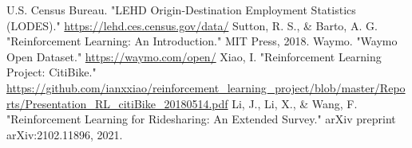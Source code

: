 \documentclass[12pt]{article}
\begin{document}
\begin{thebibliography}{9}

		 U.S. Census Bureau. "LEHD Origin-Destination Employment Statistics
		(LODES)." \url{https://lehd.ces.census.gov/data/}
		 Sutton, R. S., \& Barto, A. G. "Reinforcement Learning: An
		Introduction." MIT Press, 2018.
		 Waymo. "Waymo Open Dataset." \url{https://waymo.com/open/}
		 Xiao, I. "Reinforcement Learning Project: CitiBike."
		\url{https://github.com/ianxxiao/reinforcement_learning_project/blob/master/Reports/Presentation_RL_citiBike_20180514.pdf}
		 Li, J., Li, X., \& Wang, F. "Reinforcement Learning for
		Ridesharing: An Extended Survey." arXiv preprint arXiv:2102.11896, 2021.
\end{thebibliography}
\end{document}
